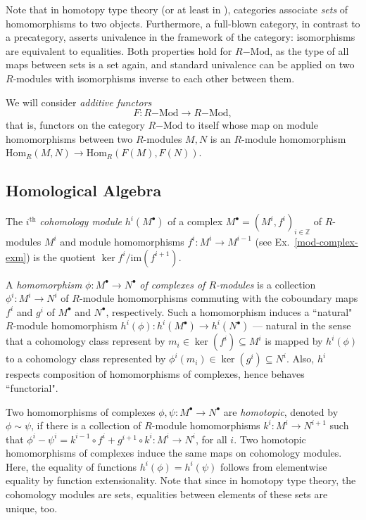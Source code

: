 \documentclass{amsart}
\theoremstyle{plain}
\numberwithin{equation}{section} %
\numberwithin{figure}{section} %
\theoremstyle{plain}
\theoremstyle{plain}
\theoremstyle{plain}
\theoremstyle{plain}
\theoremstyle{plain}
\theoremstyle{plain}
\theoremstyle{remark}
\theoremstyle{remark}
\theoremstyle{remark}
\begin{document}
Note that in homotopy type theory (or at least in \cite[9.1]{HoTTBook}), categories associate \textit{sets} of homomorphisms to two objects. Furthermore, a full-blown category, in contrast to a precategory, asserts univalence in the framework of the category: isomorphisms are equivalent to equalities. Both properties hold for $R\mathrm{-Mod}$, as the type of all maps between sets is a set again, and standard univalence can be applied on two $R$-modules with isomorphisms inverse to each other between them.

We will consider \textit{additive functors} 
\[ F: R\mathrm{-Mod} \rightarrow R\mathrm{-Mod}, \] 
that is, functors on the category $R\mathrm{-Mod}$ to itself whose map on module homomorphisms between two $R$-modules $M, N$ is an $R$-module homomorphism $\mathrm{Hom}_R(M, N) \rightarrow \mathrm{Hom}_R(F(M), F(N))$.


\subsection{Homological Algebra} \label{hom-alg-ssec}

The $i^\mathrm{th}$ \textit{cohomology module} $h^i(M^\bullet)$ of a complex $M^\bullet = (M^i, f^i)_{i \in \mathbb{Z}}$ of $R$-modules $M^i$ and module homomorphisms $f^i: M^i \rightarrow M^{i-1}$ (see Ex.~\ref{mod-complex-exm}) is the quotient $\ker{f^i}/\mathrm{im}(f^{i+1})$. 

A \textit{homomorphism} $\phi: M^\bullet \rightarrow N^\bullet$ \textit{of complexes of $R$-modules} is a collection $\phi^i: M^i \rightarrow N^i$ of $R$-module homomorphisms commuting with the coboundary maps $f^i$ and $g^i$ of $M^\bullet$ and $N^\bullet$, respectively. Such a homomorphism induces a ``natural" $R$-module homomorphism $h^i(\phi): h^i(M^\bullet) \rightarrow h^i(N^\bullet)$ --- natural in the sense that a cohomology class represent by $m_i \in \ker(f^i) \subseteq M^i$ is mapped by $h^i(\phi)$ to a cohomology class represented by $\phi^i(m_i) \in \ker(g^i) \subseteq N^i$. Also, $h^i$ respects composition of homomorphisms of complexes, hence behaves ``functorial".

Two homomorphisms of complexes $\phi, \psi: M^\bullet \rightarrow N^\bullet$ are \textit{homotopic}, denoted by $\phi \sim \psi$, if there is a collection of $R$-module homomorphisms $k^i: M^i \rightarrow N^{i+1}$ such that $\phi^i - \psi^i = k^{i-1} \circ f^i + g^{i+1} \circ k^i: M^i \rightarrow N^i$, for all $i$. Two homotopic homomorphisms of complexes induce the same maps on cohomology modules. Here, the equality of functions $h^i(\phi) = h^i(\psi)$ follows from elementwise equality by function extensionality. Note that since in homotopy type theory, the cohomology modules are sets, equalities between elements of these sets are unique, too.
\end{document}
